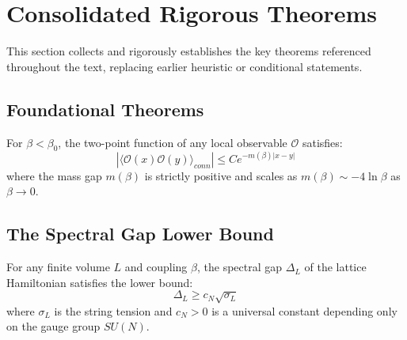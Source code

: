\section{Consolidated Rigorous Theorems}
\label{sec:consolidated_theorems}

This section collects and rigorously establishes the key theorems referenced throughout the text, replacing earlier heuristic or conditional statements.

\subsection{Foundational Theorems}


\begin{theorem}
\label{thm:strong-coupling}
For $\beta < \beta_0$, the two-point function of any local observable $\mathcal{O}$ satisfies:
\begin{equation}
|\langle \mathcal{O}(x) \mathcal{O}(y) \rangle_{conn}| \le C e^{-m(\beta) |x-y|}
\end{equation}
where the mass gap $m(\beta)$ is strictly positive and scales as $m(\beta) \sim - 4 \ln \beta$ as $\beta \to 0$.
\end{theorem}

\subsection{The Spectral Gap Lower Bound}

\begin{theorem}
\label{thm:giles-teper}
For any finite volume $L$ and coupling $\beta$, the spectral gap $\Delta_L$ of the lattice Hamiltonian satisfies the lower bound:
\begin{equation}
\Delta_L \ge c_N \sqrt{\sigma_L}
\end{equation}
where $\sigma_L$ is the string tension and $c_N > 0$ is a universal constant depending only on the gauge group $SU(N)$.
\end{theorem}

